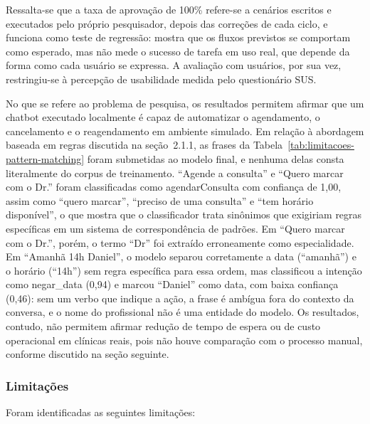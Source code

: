 \documentclass[12pt,a4paper]{extarticle}
\begin{document}
Ressalta-se que a taxa de aprovação de 100\% refere-se a cenários escritos e executados pelo próprio pesquisador, depois das correções de cada ciclo, e funciona como teste de regressão: mostra que os fluxos previstos se comportam como esperado, mas não mede o sucesso de tarefa em uso real, que depende da forma como cada usuário se expressa. A avaliação com usuários, por sua vez, restringiu-se à percepção de usabilidade medida pelo questionário SUS.

No que se refere ao problema de pesquisa, os resultados permitem afirmar que um chatbot executado localmente é capaz de automatizar o agendamento, o cancelamento e o reagendamento em ambiente simulado. Em relação à abordagem baseada em regras discutida na seção~2.1.1, as frases da Tabela~\ref{tab:limitacoes-pattern-matching} foram submetidas ao modelo final, e nenhuma delas consta literalmente do corpus de treinamento. ``Agende a consulta'' e ``Quero marcar com o Dr.'' foram classificadas como agendarConsulta com confiança de 1,00, assim como ``quero marcar'', ``preciso de uma consulta'' e ``tem horário disponível'', o que mostra que o classificador trata sinônimos que exigiriam regras específicas em um sistema de correspondência de padrões. Em ``Quero marcar com o Dr.'', porém, o termo ``Dr'' foi extraído erroneamente como especialidade. Em ``Amanhã 14h Daniel'', o modelo separou corretamente a data (``amanhã'') e o horário (``14h'') sem regra específica para essa ordem, mas classificou a intenção como negar\_\allowbreak{}data (0,94) e marcou ``Daniel'' como data, com baixa confiança (0,46): sem um verbo que indique a ação, a frase é ambígua fora do contexto da conversa, e o nome do profissional não é uma entidade do modelo. Os resultados, contudo, não permitem afirmar redução de tempo de espera ou de custo operacional em clínicas reais, pois não houve comparação com o processo manual, conforme discutido na seção seguinte.

\subsubsection{Limitações}
\label{sec:limitacoes}

Foram identificadas as seguintes limitações:
\end{document}
